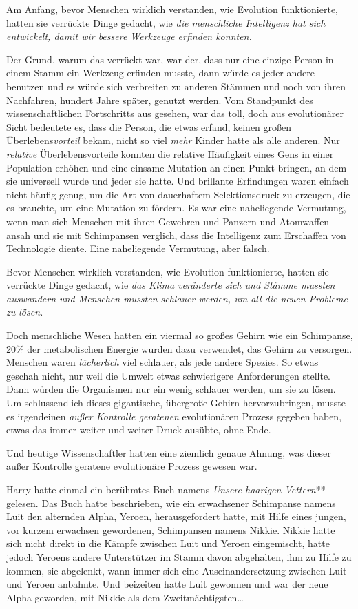 {Am Anfang, bevor Menschen wirklich verstanden, wie Evolution funktionierte, hatten sie verrückte Dinge gedacht, wie \emph{die menschliche Intelligenz hat sich entwickelt, damit wir bessere Werkzeuge erfinden konnten.}

Der Grund, warum das verrückt war, war der, dass nur eine einzige Person in einem Stamm ein Werkzeug erfinden musste, dann würde es jeder andere benutzen und es würde sich verbreiten zu anderen Stämmen und noch von ihren Nachfahren, hundert Jahre später, genutzt werden. Vom Standpunkt des wissenschaftlichen Fortschritts aus gesehen, war das toll, doch aus evolutionärer Sicht bedeutete es, dass die Person, die etwas erfand, keinen großen Überlebens\emph{vorteil} bekam, nicht so viel \emph{mehr} Kinder hatte als alle anderen. Nur \emph{relative} Überlebensvorteile konnten die relative Häufigkeit eines Gens in einer Population erhöhen und eine einsame Mutation an einen Punkt bringen, an dem sie universell wurde und jeder sie hatte. Und brillante Erfindungen waren einfach nicht häufig genug, um die Art von dauerhaftem Selektionsdruck zu erzeugen, die es brauchte, um eine Mutation zu fördern. Es war eine naheliegende Vermutung, wenn man sich Menschen mit ihren Gewehren und Panzern und Atomwaffen ansah und sie mit Schimpansen verglich, dass die Intelligenz zum Erschaffen von Technologie diente. Eine naheliegende Vermutung, aber falsch.

Bevor Menschen wirklich verstanden, wie Evolution funktionierte, hatten sie verrückte Dinge gedacht, wie \emph{das Klima veränderte sich und Stämme mussten auswandern und Menschen mussten schlauer werden, um all die neuen Probleme zu lösen.}

Doch menschliche Wesen hatten ein viermal so großes Gehirn wie ein Schimpanse, 20\% der metabolischen Energie wurden dazu verwendet, das Gehirn zu versorgen. Menschen waren \emph{lächerlich} viel schlauer, als jede andere Spezies. So etwas geschah nicht, nur weil die Umwelt etwas schwierigere Anforderungen stellte. Dann würden die Organismen nur ein wenig schlauer werden, um sie zu lösen. Um schlussendlich dieses gigantische, übergroße Gehirn hervorzubringen, musste es irgendeinen \emph{außer Kontrolle geratenen} evolutionären Prozess gegeben haben, etwas das immer weiter und weiter Druck ausübte, ohne Ende.

Und heutige Wissenschaftler hatten eine ziemlich genaue Ahnung, was dieser außer Kontrolle geratene evolutionäre Prozess gewesen war.

Harry hatte einmal ein berühmtes Buch namens \emph{Unsere haarigen Vettern}** gelesen. Das Buch hatte beschrieben, wie ein erwachsener Schimpanse namens Luit den alternden Alpha, Yeroen, herausgefordert hatte, mit Hilfe eines jungen, vor kurzem erwachsen gewordenen, Schimpansen namens Nikkie. Nikkie hatte sich nicht direkt in die Kämpfe zwischen Luit und Yeroen eingemischt, hatte jedoch Yeroens andere Unterstützer im Stamm davon abgehalten, ihm zu Hilfe zu kommen, sie abgelenkt, wann immer sich eine Auseinandersetzung zwischen Luit und Yeroen anbahnte. Und beizeiten hatte Luit gewonnen und war der neue Alpha geworden, mit Nikkie als dem Zweitmächtigsten…

}
